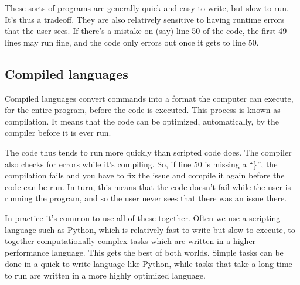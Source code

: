 \documentclass[letterpaper,10pt,british]{sphinxmanual}
\begin{document}
\sphinxAtStartPar
These sorts of programs are generally quick and easy to write, but slow to run. It’s thus a trade\sphinxhyphen{}off. They are also relatively sensitive to having run\sphinxhyphen{}time errors that the user sees. If there’s a mistake on (say) line 50 of the code, the first 49 lines may run fine, and the code only errors out once it gets to line 50.


\subsection{Compiled languages}
\label{\detokenize{chapters/motivation/language_types:compiled-languages}}
\sphinxAtStartPar
Compiled languages convert commands into a format the computer can execute, for the entire program, before the code is executed. This process is known as compilation. It means that the code can be optimized, automatically, by the compiler before it is ever run.

\sphinxAtStartPar
The code thus tends to run more quickly than scripted code does. The compiler also checks for errors while it’s compiling. So, if line 50 is missing a “\}”, the compilation fails and you have to fix the issue and compile it again before the code can be run. In turn, this means that the code doesn’t fail while the user is running the program, and so the user never sees that there was an issue there.

\sphinxAtStartPar
In practice it’s common to use all of these together. Often we use a scripting language such as Python, which is relatively fast to write but slow to execute, to  together computationally complex tasks which are written in a higher performance language. This gets the best of both worlds. Simple tasks can be done in a quick to write language like Python, while tasks that take a long time to run are written in a more highly optimized language.
\end{document}
